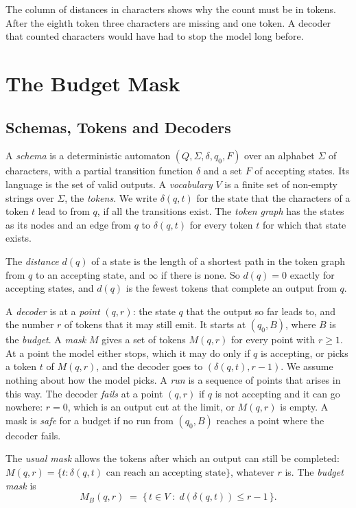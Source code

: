 \documentclass[acmsmall,nonacm,screen]{acmart}
\newcommand{\far}{d}
\begin{document}
The column of distances in characters shows why the count must be in tokens. After the
eighth token three characters are missing and one token. A decoder that counted characters
would have had to stop the model long before.

\section{The Budget Mask}\label{sec:mask}

\subsection{Schemas, Tokens and Decoders}

A \emph{schema} is a deterministic automaton $(Q, \Sigma, \delta, q_0, F)$ over an alphabet
$\Sigma$ of characters, with a partial transition function $\delta$ and a set $F$ of
accepting states. Its language is the set of valid outputs. A \emph{vocabulary} $V$ is a
finite set of non-empty strings over $\Sigma$, the \emph{tokens}. We write $\delta(q, t)$ for
the state that the characters of a token $t$ lead to from $q$, if all the transitions exist.
The \emph{token graph} has the states as its nodes and an edge from $q$ to $\delta(q, t)$
for every token $t$ for which that state exists.

The \emph{distance} $\far(q)$ of a state is the length of a shortest path in the token graph
from $q$ to an accepting state, and $\infty$ if there is none. So $\far(q) = 0$ exactly for
accepting states, and $\far(q)$ is the fewest tokens that complete an output from $q$.

A \emph{decoder} is at a \emph{point} $(q, r)$: the state $q$ that the output so far leads
to, and the number $r$ of tokens that it may still emit. It starts at $(q_0, B)$, where $B$
is the \emph{budget}. A \emph{mask} $M$ gives a set of tokens $M(q, r)$ for every point with
$r \ge 1$. At a point the model either stops, which it may do only if $q$ is accepting, or
picks a token $t$ of $M(q, r)$, and the decoder goes to $(\delta(q, t), r - 1)$. We assume
nothing about how the model picks. A \emph{run} is a sequence of points that arises in this
way. The decoder \emph{fails} at a point $(q, r)$ if $q$ is not accepting and it can go
nowhere: $r = 0$, which is an output cut at the limit, or $M(q, r)$ is empty. A mask is
\emph{safe} for a budget if no run from $(q_0, B)$ reaches a point where the decoder fails.

The \emph{usual mask} allows the tokens after which an output can still be completed:
$M(q, r) = \{t : \delta(q, t) \text{ can reach an accepting state}\}$, whatever $r$ is. The
\emph{budget mask} is
\[
  M_B(q, r) \;=\; \{\, t \in V \;:\; \far(\delta(q, t)) \le r - 1 \,\}.
\]
\end{document}
